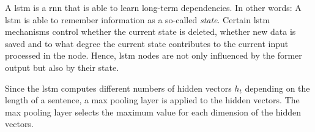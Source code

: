 A \ac{lstm} is a \ac{rnn} that is able to learn long-term dependencies.
In other words: 
A \ac{lstm} is able to remember information as a so-called \textit{state}.
Certain \ac{lstm} mechanisms control whether the current state is deleted, whether new data is saved and 
to what degree the current state contributes to the current input processed in the node.
Hence, \ac{lstm} nodes are not only influenced by the former output but also by their state.

Since the \ac{lstm} computes different numbers of hidden vectors $h_t$ depending on the length of a sentence, a max pooling layer is applied to the hidden vectors.
The max pooling layer selects the maximum value for each dimension of the hidden vectors.


